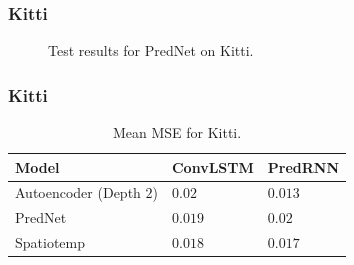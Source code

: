   \begin{frame}
   \frametitle{Kitti}
   
   \begin{figure}[H]
   \centering
   \qquad
   \qquad
   \caption{Test results for PredNet on Kitti.}
   \label{figure::prednet_kth_results}
  \end{figure}
   
  \end{frame}
  \begin{frame}
   \frametitle{Kitti}
   
   \begin{table}[H]
    \begin{center}
     \begin{tabular}{| l | l | l |}\hline
      \textbf{Model} & \textbf{ConvLSTM} & \textbf{PredRNN} \\\hline
      Autoencoder (Depth $2$) & $0.02$ & $0.013$ \\\hline
      PredNet & $0.019$ & $0.02$ \\\hline
      Spatiotemp & $0.018$ & $0.017$ \\\hline
     \end{tabular}
    \end{center}
    \caption{Mean MSE for Kitti.}
   \end{table}   
   
  \end{frame}
 
